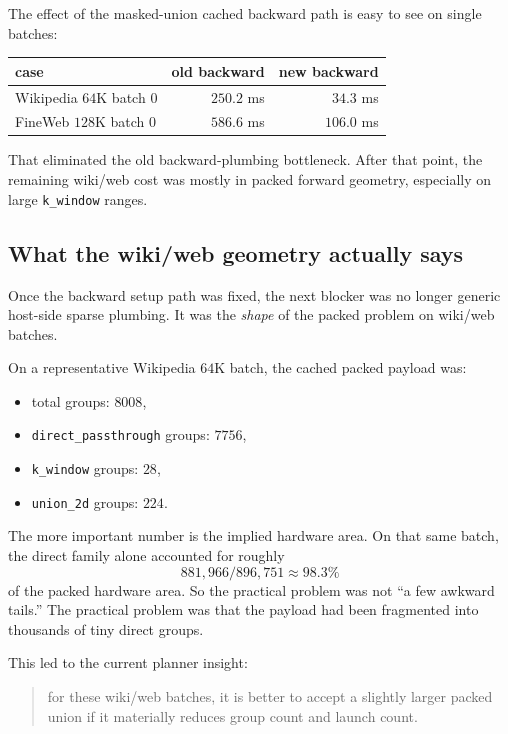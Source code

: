 \documentclass[11pt]{article}
\begin{document}
The effect of the masked-union cached backward path is easy to see on single
batches:
\begin{center}
\begin{tabular}{lrr}
\toprule
case & old backward & new backward \\
\midrule
Wikipedia $64$K batch $0$ & $250.2$ ms & $34.3$ ms \\
FineWeb $128$K batch $0$ & $586.6$ ms & $106.0$ ms \\
\bottomrule
\end{tabular}
\end{center}

That eliminated the old backward-plumbing bottleneck. After that point, the
remaining wiki/web cost was mostly in packed forward geometry, especially on
large \texttt{k\_window} ranges.

\subsection{What the wiki/web geometry actually says}

Once the backward setup path was fixed, the next blocker was no longer generic
host-side sparse plumbing. It was the \emph{shape} of the packed problem on
wiki/web batches.

On a representative Wikipedia $64$K batch, the cached packed payload was:
\begin{itemize}[leftmargin=1.5em]
    \item total groups: \(8008\),
    \item \texttt{direct\_passthrough} groups: \(7756\),
    \item \texttt{k\_window} groups: \(28\),
    \item \texttt{union\_2d} groups: \(224\).
\end{itemize}

The more important number is the implied hardware area. On that same batch, the
direct family alone accounted for roughly
\[
881{,}966 / 896{,}751 \approx 98.3\%
\]
of the packed hardware area. So the practical problem was not ``a few awkward
tails.'' The practical problem was that the payload had been fragmented into
thousands of tiny direct groups.

This led to the current planner insight:
\begin{quote}
for these wiki/web batches, it is better to accept a slightly larger packed
union if it materially reduces group count and launch count.
\end{quote}
\end{document}
